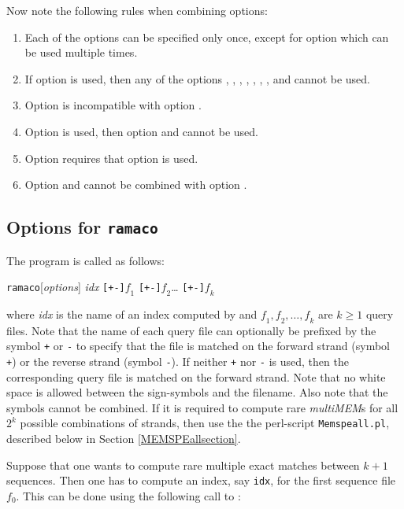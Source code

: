 \documentclass[12pt]{article}
\newcommand{\SEMM}{\texttt{ramaco}\xspace}
\newcommand{\MEMSPEall}{\texttt{Memspeall.pl}\xspace}
\newcommand{\MMEM}[0]{\textit{multiMEM}\xspace}
\begin{document}
Now note the following rules when combining options:
\begin{enumerate}
\item
Each of the options can be specified only once, except for option
 which can be used multiple times.
\item
If option  is used, then
any of the options  
,
,
,
,
,
,
, and
cannot be used.
\item
Option  is incompatible with option
.
\item
Option  is used, then option 
 and  cannot be used.
\item
Option  requires that option
 is used.
\item
Option  and  cannot be 
combined with option .
\end{enumerate}

\subsection{Options for \SEMM}

The program is called as follows:
\par
\noindent\SEMM [\emph{options}] \emph{idx} 
\texttt{[+-]}$\mathit{f}_{1}$
\texttt{[+-]}$\mathit{f}_{2}$\ldots
\texttt{[+-]}$\mathit{f}_{k}$
\par
where \emph{idx} is the name of an index computed by \MKV and 
\(\mathit{f}_{1},\mathit{f}_{2},\ldots,\mathit{f}_{k}\)  are 
\(k\geq 1\) query files. Note that the name of each query file can optionally
be prefixed by the symbol \texttt{+} or \texttt{-} to specify that the
file is matched on the forward strand (symbol \texttt{+}) or the reverse
strand (symbol \texttt{-}). If neither  \texttt{+} nor \texttt{-} is used,
then the corresponding query file is matched on the forward strand. Note
that no white space is allowed between the sign-symbols and the filename.
Also note that the symbols cannot be combined. If it is required to
compute rare \MMEM{s} for all $2^{k}$ possible combinations of strands,
then use the the perl-script \MEMSPEall, described below in Section
\ref{MEMSPEallsection}.

Suppose that one wants to compute rare multiple
exact matches between \(k+1\) sequences. Then one has to compute an 
index, say \texttt{idx}, for the first sequence file \(f_{0}\). This
can be done using the following call to \MKV:
\end{document}

